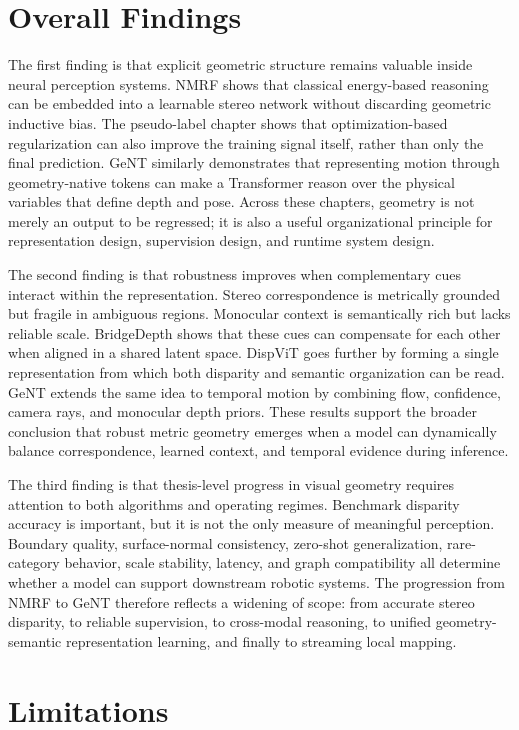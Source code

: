 \section{Overall Findings}

The first finding is that explicit geometric structure remains valuable inside neural perception systems.
NMRF shows that classical energy-based reasoning can be embedded into a learnable stereo network without discarding geometric inductive bias.
The pseudo-label chapter shows that optimization-based regularization can also improve the training signal itself, rather than only the final prediction.
GeNT similarly demonstrates that representing motion through geometry-native tokens can make a Transformer reason over the physical variables that define depth and pose.
Across these chapters, geometry is not merely an output to be regressed; it is also a useful organizational principle for representation design, supervision design, and runtime system design.

The second finding is that robustness improves when complementary cues interact within the representation.
Stereo correspondence is metrically grounded but fragile in ambiguous regions.
Monocular context is semantically rich but lacks reliable scale.
BridgeDepth shows that these cues can compensate for each other when aligned in a shared latent space.
DispViT goes further by forming a single representation from which both disparity and semantic organization can be read.
GeNT extends the same idea to temporal motion by combining flow, confidence, camera rays, and monocular depth priors.
These results support the broader conclusion that robust metric geometry emerges when a model can dynamically balance correspondence, learned context, and temporal evidence during inference.

The third finding is that thesis-level progress in visual geometry requires attention to both algorithms and operating regimes.
Benchmark disparity accuracy is important, but it is not the only measure of meaningful perception.
Boundary quality, surface-normal consistency, zero-shot generalization, rare-category behavior, scale stability, latency, and graph compatibility all determine whether a model can support downstream robotic systems.
The progression from NMRF to GeNT therefore reflects a widening of scope: from accurate stereo disparity, to reliable supervision, to cross-modal reasoning, to unified geometry-semantic representation learning, and finally to streaming local mapping.

\section{Limitations}

